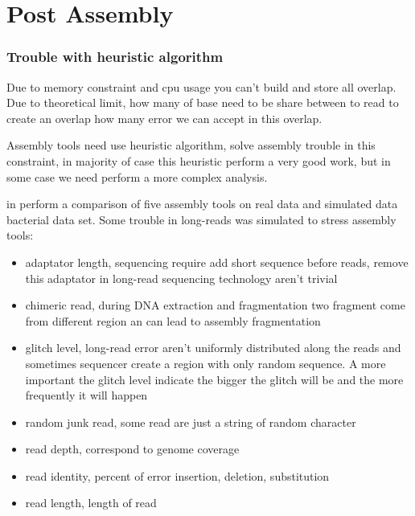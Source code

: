 \documentclass[main.tex]{subfiles}
\begin{document}
\chapter{Post Assembly} \label{chapter:postassembly}


\subsection{Trouble with heuristic algorithm}

Due to memory constraint and cpu usage you can't build and store all overlap.
Due to theoretical limit, how many of base need to be share between to read to create an overlap how many error we can accept in this overlap.

Assembly tools need use heuristic algorithm, solve assembly trouble in this constraint, in majority of case this heuristic perform a very good work, but in some case we need perform a more complex analysis.

\citeauthor{long_read_assembler_comparison} in \cite{long_read_assembler_comparison} perform a comparison of five assembly tools on real data and simulated data bacterial data set. Some trouble in long-reads was simulated to stress assembly tools:
\begin{itemize}
    \item adaptator length, sequencing require add short sequence before reads, remove this adaptator in long-read sequencing technology aren't trivial
    \item chimeric read, during DNA extraction and fragmentation two fragment come from different region an can lead to assembly fragmentation
    \item glitch level, long-read error aren't uniformly distributed along the reads and sometimes sequencer create a region with only random sequence. A more important the glitch level indicate the bigger the glitch will be and the more frequently it will happen
    \item random junk read, some read are just a string of random character
    \item read depth, correspond to genome coverage
    \item read identity, percent of error insertion, deletion, substitution 
    \item read length, length of read 
\end{itemize}
\end{document}
